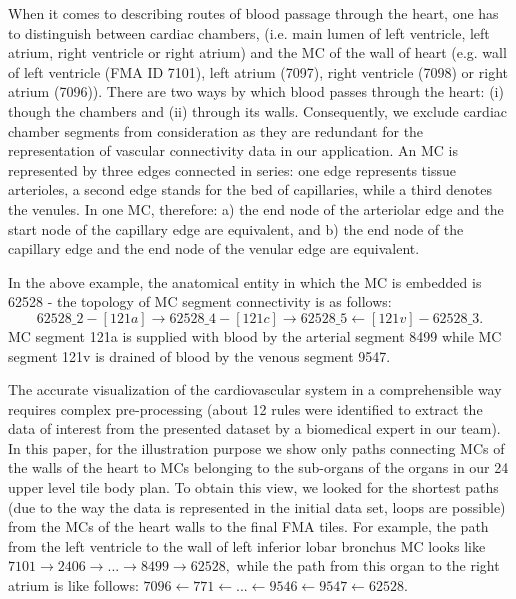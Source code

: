 When it comes to describing routes of blood passage through the heart, one has to distinguish between cardiac chambers, (i.e. main lumen of left ventricle, left atrium, right ventricle or right atrium) and the MC of the wall of heart (e.g. wall of left ventricle (FMA ID 7101), left atrium (7097), right ventricle (7098) or right atrium (7096)). There are two ways by which blood passes through the heart: (i) though the chambers and (ii) through its walls. Consequently, we exclude cardiac chamber segments from consideration as they are redundant for the representation of vascular connectivity data in our application.
An MC is represented by three edges connected in series: one edge represents tissue arterioles, a second edge stands for the bed of
capillaries, while a third denotes the venules. In one MC, therefore: a) the end node of the arteriolar edge and the start node of the
capillary edge are equivalent, and b) the end node of the capillary edge and the end node of the venular
edge are equivalent.

In the above example, the anatomical entity in which the MC is embedded is 62528 - the topology of MC segment connectivity is as follows:
$$62528\_2 - [121a] \rightarrow 62528\_4 - [121c] \rightarrow 62528\_5 \leftarrow [121v] - 62528\_3.$$
MC segment 121a is supplied with blood by the arterial segment 8499 while MC segment 121v is drained of blood by the venous segment 9547.

The accurate visualization of the cardiovascular system in a comprehensible way requires complex pre-processing (about 12 rules were identified to extract the data of interest from the presented dataset by a biomedical expert in our team).
In this paper, for the illustration purpose we show only paths connecting MCs of the walls of the heart to MCs belonging to the sub-organs of the organs in our 24 upper level tile body plan.
To obtain this view, we looked for the shortest paths (due to the way the data is represented in the initial data set, loops are possible) from the MCs of the heart walls to the final FMA tiles. For example, the path from the left ventricle to the wall of left inferior lobar bronchus MC looks like 
{$7101 \rightarrow 2406 \rightarrow ... \rightarrow 8499 \rightarrow 62528,$}
while the path from this organ to the right atrium is like follows: 
{$7096 \leftarrow 771 \leftarrow ... \leftarrow 9546 \leftarrow 9547 \leftarrow 62528.$}

